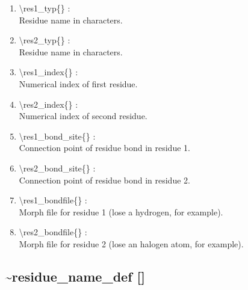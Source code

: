\documentclass[12pt,titlepage]{article}
\begin{document}
\begin{enumerate}

 \vspace{0.15in} 
 \item  \textbackslash{}res1\_typ\{\} : \\ 
    Residue name in characters.

 \vspace{0.15in} 
 \item  \textbackslash{}res2\_typ\{\} : \\ 
    Residue name in characters.

 \vspace{0.15in} 
 \item  \textbackslash{}res1\_index\{\} : \\ 
    Numerical index of first residue.

 \vspace{0.15in} 
 \item  \textbackslash{}res2\_index\{\} : \\ 
    Numerical index of second residue.

 \vspace{0.15in} 
 \item  \textbackslash{}res1\_bond\_site\{\} : \\ 
   Connection point of residue bond in residue 1.

 \vspace{0.15in} 
 \item  \textbackslash{}res2\_bond\_site\{\} : \\ 
   Connection point of residue bond in residue 2.

 \vspace{0.15in} 
 \item  \textbackslash{}res1\_bondfile\{\} : \\ 
   Morph file for residue 1 (lose a hydrogen, for example).

 \vspace{0.15in} 
 \item  \textbackslash{}res2\_bondfile\{\} : \\ 
   Morph file for residue 2 (lose an halogen atom, for example).
  
\end{enumerate}

\newpage
\subsection*{\bf \~{ }residue\_name\_def []}
\end{document}
